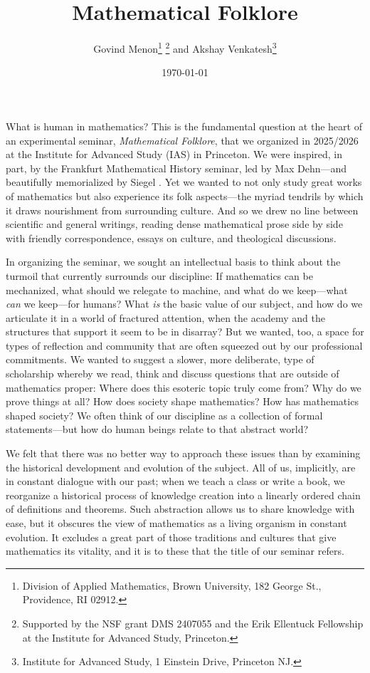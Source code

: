 \documentclass{article}
\title{Mathematical Folklore}
\author{Govind Menon\thanks{Division of Applied Mathematics, Brown University, 182 George St., Providence, RI 02912.} \thanks{Supported by the NSF grant DMS 2407055 and the Erik Ellentuck Fellowship at the Institute for Advanced Study, Princeton. } and Akshay Venkatesh\thanks{Institute for Advanced Study, 1 Einstein Drive, Princeton NJ.}}
\date{\today}
\begin{document}
\maketitle
 
What is human in mathematics? This is the fundamental question at the heart of an experimental seminar, {\em Mathematical Folklore}, that we organized in 2025/2026 
at the Institute for Advanced Study (IAS) in Princeton. We were inspired, in part, by the Frankfurt Mathematical History seminar, led by Max Dehn—and beautifully memorialized by Siegel \cite{siegel_frankfurt_seminar}. Yet we wanted to not only study great works of mathematics but also experience its folk aspects—the myriad tendrils by which it draws nourishment from surrounding culture.   And so we drew no line between scientific and general writings, reading dense mathematical prose side by side with friendly correspondence, essays on culture, and theological discussions. 


 
 


  In organizing the seminar, we sought an intellectual basis to think about the turmoil that currently surrounds our discipline: If mathematics can be mechanized, what should we relegate to machine, and what do we keep---what {\em can} we keep---for humans? What {\em is} the basic value of our subject, and how do we articulate it in a world of fractured attention, when the academy and the structures that support it seem to be in disarray? But we wanted, too, a space for types of reflection and community that are often squeezed out by our professional commitments. We wanted to suggest a slower, more deliberate, type of scholarship whereby we read, think and discuss questions that are outside of mathematics proper: Where does this esoteric topic truly come from? Why do we prove things at all? How does society shape mathematics? How has mathematics shaped society? We often think of our discipline as a collection of formal statements—but how do human beings relate to that abstract world?
  
   
 
 We felt that there was no better way to approach these issues than by examining the historical development and evolution of the subject. All of us, implicitly, are in constant dialogue with our past; when we teach a class or write a book, we reorganize a historical process of knowledge creation into a linearly ordered chain of definitions and theorems. Such abstraction allows us to share knowledge with ease, but it obscures the view of mathematics as a living organism in constant evolution. It excludes a great part of those traditions and cultures that give mathematics its vitality,
 and it is to these that the title of our seminar refers. 
\end{document}
